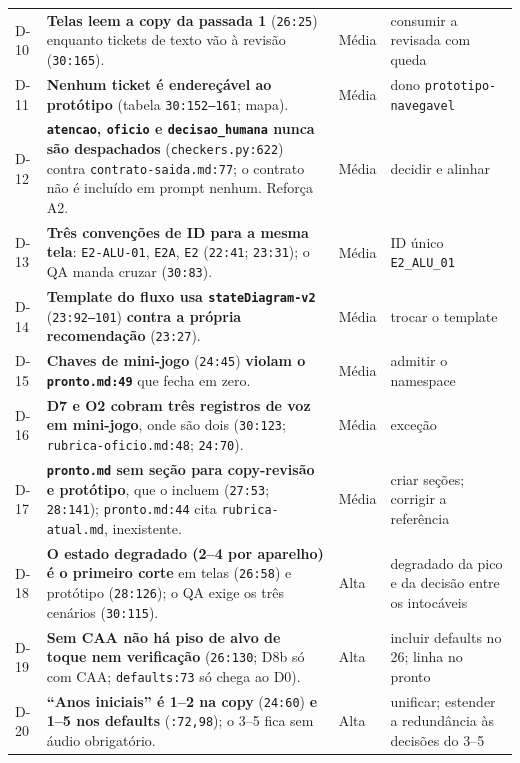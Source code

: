 \documentclass[11pt,a4paper]{article}
\begin{document}
\begin{longtable}{@{}p{0.9cm} >{\raggedright\arraybackslash}p{8.6cm} p{1.1cm} >{\raggedright\arraybackslash}p{4.9cm}@{}}
D-10 & \textbf{Telas leem a copy da passada 1} (\texttt{26:25}) enquanto tickets de texto vão à revisão (\texttt{30:165}). & Média & consumir a revisada com queda \\
D-11 & \textbf{Nenhum ticket é endereçável ao protótipo} (tabela \texttt{30:152--161}; mapa). & Média & dono \texttt{prototipo-navegavel} \\
D-12 & \textbf{\texttt{atencao}, \texttt{oficio} e \texttt{decisao\_humana} nunca são despachados} (\texttt{checkers.py:622}) contra \texttt{contrato-saida.md:77}; o contrato não é incluído em prompt nenhum. Reforça A2. & Média & decidir e alinhar \\
D-13 & \textbf{Três convenções de ID para a mesma tela}: \texttt{E2-ALU-01}, \texttt{E2A}, \texttt{E2} (\texttt{22:41}; \texttt{23:31}); o QA manda cruzar (\texttt{30:83}). & Média & ID único \texttt{E2\_ALU\_01} \\
D-14 & \textbf{Template do fluxo usa \texttt{stateDiagram-v2}} (\texttt{23:92--101}) \textbf{contra a própria recomendação} (\texttt{23:27}). & Média & trocar o template \\
D-15 & \textbf{Chaves de mini-jogo} (\texttt{24:45}) \textbf{violam o \texttt{pronto.md:49}} que fecha em zero. & Média & admitir o namespace \\
D-16 & \textbf{D7 e O2 cobram três registros de voz em mini-jogo}, onde são dois (\texttt{30:123}; \texttt{rubrica-oficio.md:48}; \texttt{24:70}). & Média & exceção \\
D-17 & \textbf{\texttt{pronto.md} sem seção para copy-revisão e protótipo}, que o incluem (\texttt{27:53}; \texttt{28:141}); \texttt{pronto.md:44} cita \texttt{rubrica-atual.md}, inexistente. & Média & criar seções; corrigir a referência \\
D-18 & \textbf{O estado degradado (2--4 por aparelho) é o primeiro corte} em telas (\texttt{26:58}) e protótipo (\texttt{28:126}); o QA exige os três cenários (\texttt{30:115}). & Alta & degradado da pico e da decisão entre os intocáveis \\
D-19 & \textbf{Sem CAA não há piso de alvo de toque nem verificação} (\texttt{26:130}; D8b só com CAA; \texttt{defaults:73} só chega ao D0). & Alta & incluir defaults no 26; linha no pronto \\
D-20 & \textbf{``Anos iniciais'' é 1\textordmasculine{}--2\textordmasculine{} na copy} (\texttt{24:60}) \textbf{e 1\textordmasculine{}--5\textordmasculine{} nos defaults} (\texttt{:72,98}); o 3\textordmasculine{}--5\textordmasculine{} fica sem áudio obrigatório. & Alta & unificar; estender a redundância às decisões do 3\textordmasculine{}--5\textordmasculine{} \\

\end{longtable}
\end{document}
